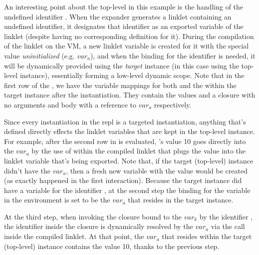 		\begin{paragraph-here}
			An interesting point about the top-level in this example is the handling of the undefined identifier . When the expander generates a linklet containing an undefined identifier, it designates that identifier as an exported variable of the linklet (despite having no corresponding definition for it). During the compilation of the linklet on the VM, a new linklet variable is created for it with the special value \emph{uninitialized} (e.g. $var_a$), and when the binding for the identifier is needed, it will be dynamically provided using the \emph{target} instance (in this case using the top-level instance), essentially forming a low-level dynamic scope. Note that in the first row of the , we have the variable mappings for both  and the  within the target instance after the instantiation. They contain the values  and a closure with no arguments and body with a reference to $var_a$ respectively.
		\end{paragraph-here}

		\begin{paragraph-here}
			Since every instantiation in the \gls{repl} is a targeted instantiation, anything that's defined directly effects the linklet variables that are kept in the top-level instance. For example, after the second row in  is evaluated, 's value 10 goes directly into the $var_a$ by the use of  within the compiled linklet that plugs the value into the linklet variable that's being \smartQL exported\smartQR. Note that, if the target (top-level) instance didn't have the $var_a$, then a fresh new variable with the  value would be created (as exactly happened in the first interaction). Because the target instance did have a variable for the identifier , at the second step the binding for the variable  in the environment is set to be the $var_a$ that resides in the target instance.
		\end{paragraph-here}
		\begin{paragraph-here}
			At the third step, when invoking the closure bound to the $var_k$ by the identifier , the identifier  inside the closure is dynamically resolved by the $var_a$ via the  call inside the compiled linklet. At that point, the $var_a$ that resides within the target (top-level) instance contains the value 10, thanks to the previous step.
		\end{paragraph-here}

